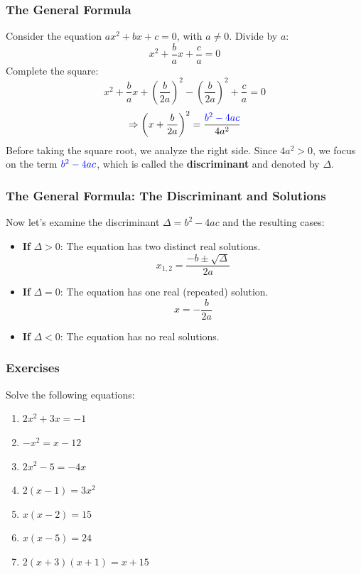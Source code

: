 \documentclass[10pt]{beamer}
\begin{document}
	\begin{frame}
		\frametitle{The General Formula}
		\begin{block}{}
			Consider the equation \( ax^2 + bx + c = 0 \), with \( a \neq 0 \). Divide by \( a \):
			\[
			x^2 + \frac{b}{a}x + \frac{c}{a} = 0
			\]
			Complete the square:
			\[
			x^2 + \frac{b}{a}x + \left(\frac{b}{2a}\right)^2 - \left(\frac{b}{2a}\right)^2 + \frac{c}{a} = 0
			\]
			\[
			\Rightarrow \left(x + \frac{b}{2a}\right)^2 = \frac{\textcolor{blue}{b^2 - 4ac}}{4a^2}
			\]
			Before taking the square root, we analyze the right side. Since \( 4a^2 > 0 \), we focus on the term \( \textcolor{blue}{b^2 - 4ac} \), which is called the \textbf{discriminant} and denoted by \( \Delta \).
		\end{block}
	\end{frame}
	
	\begin{frame}
		\frametitle{The General Formula: The Discriminant and Solutions}
		\begin{block}{}
			Now let’s examine the discriminant \( \Delta = b^2 - 4ac \) and the resulting cases:
			
			\begin{itemize}
				\item \textbf{If} \( \Delta > 0 \): The equation has two distinct real solutions.
				\[
				x_{1,2} = \frac{-b \pm \sqrt{\Delta}}{2a}
				\]
				
				\item \textbf{If} \( \Delta = 0 \): The equation has one real (repeated) solution.
				\[
				x = -\frac{b}{2a}
				\]
				
				\item \textbf{If} \( \Delta < 0 \): The equation has no real solutions.
			\end{itemize}
		\end{block}
	\end{frame}
	
	\begin{frame}
		\frametitle{Exercises}
		\begin{alertblock}{Solve the following equations:}
			\begin{enumerate}
				\item \( 2x^2 + 3x = -1 \)
				\item \( -x^2 = x - 12 \)
				\item \( 2x^2 - 5 = -4x \)
				\item \( 2(x - 1) = 3x^2 \)
				\item \( x(x - 2) = 15 \)
				\item \( x(x - 5) = 24 \)
				\item \( 2(x + 3)(x + 1) = x + 15 \)
			\end{enumerate}
		\end{alertblock}
	\end{frame}
	
\end{document}
